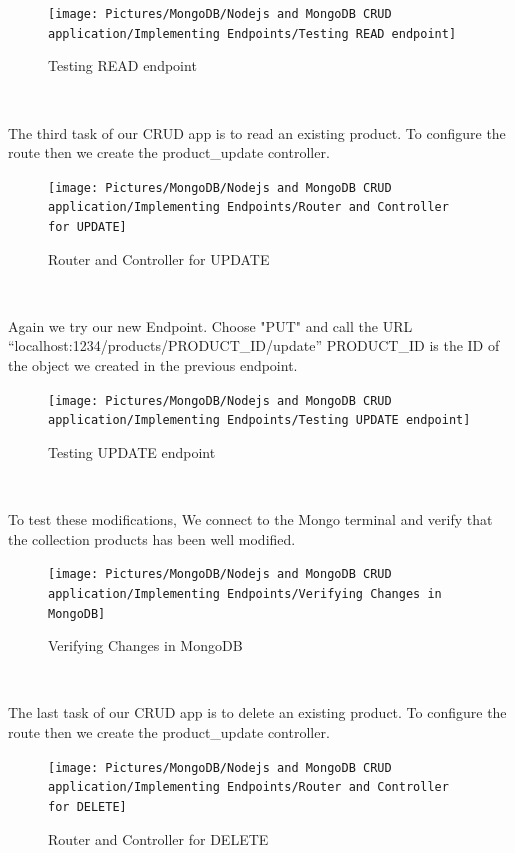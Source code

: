 \begin{spacing}{1.2}
\begin{figure}[!htb] 
\begin{center} 
\texttt{[image: Pictures/MongoDB/Nodejs and MongoDB CRUD  application/Implementing Endpoints/Testing READ endpoint]} 
\end{center} 
\caption{Testing READ endpoint} 
\end{figure}  \FloatBarrier
\\

\par The third task of our CRUD app is to read an existing product.
To configure the route then we create the product\_update controller.
\begin{figure}[!htb] 
\begin{center} 
\texttt{[image: Pictures/MongoDB/Nodejs and MongoDB CRUD  application/Implementing Endpoints/Router and Controller for UPDATE]} 
\end{center} 
\caption{Router and Controller for UPDATE} 
\end{figure}  \FloatBarrier
\\
\newpage
\par Again we try our new Endpoint. Choose "PUT" and call the URL
“localhost:1234/products/PRODUCT\_ID/update”
PRODUCT\_ID is the ID of the object we created in the previous endpoint.
\\
\begin{figure}[!htb] 
\begin{center} 
\texttt{[image: Pictures/MongoDB/Nodejs and MongoDB CRUD  application/Implementing Endpoints/Testing UPDATE endpoint]} 
\end{center} 
\caption{Testing UPDATE endpoint} 
\end{figure}  \FloatBarrier
\\

\par To test these modifications, We connect to the Mongo terminal and verify that the collection
products has been well modified.
\\
\begin{figure}[!htb] 
\begin{center} 
\texttt{[image: Pictures/MongoDB/Nodejs and MongoDB CRUD  application/Implementing Endpoints/Verifying Changes in MongoDB]} 
\end{center} 
\caption{Verifying Changes in MongoDB} 
\end{figure}  \FloatBarrier
\\

\newpage
\par The last task of our CRUD app is to delete an existing product.
To configure the route then we create the product\_update controller.
\begin{figure}[!htb] 
\begin{center} 
\texttt{[image: Pictures/MongoDB/Nodejs and MongoDB CRUD  application/Implementing Endpoints/Router and Controller for DELETE]} 
\end{center} 
\caption{Router and Controller for DELETE} 
\end{figure}  \FloatBarrier
\\


\end{spacing}
